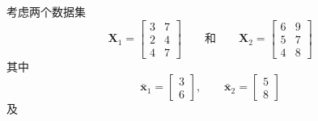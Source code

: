 
\quad 考虑两个数据集
\[
\mathbf{X}_1=\begin{bmatrix}3&7\\2&4\\4&7\end{bmatrix}
\qquad\text{和}\qquad
\mathbf{X}_2=\begin{bmatrix}6&9\\5&7\\4&8\end{bmatrix}
\]
其中
\[
\bar{\mathbf{x}}_1=\begin{bmatrix}3\\6\end{bmatrix},\qquad
\bar{\mathbf{x}}_2=\begin{bmatrix}5\\8\end{bmatrix}
\]
及
